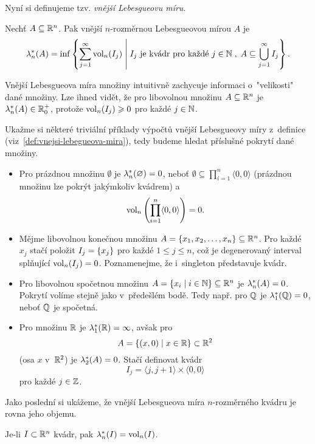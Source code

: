Nyní si definujeme tzv. \emph{vnější Lebesgueovu míru}.
\begin{definition}\label{def:vnejsi-lebegueova-mira}
    Nechť $A\subseteq\mathbb{R}^n$. Pak vnější $n$-rozměr\-nou Lebesgueovou mírou $A$ je
    \[\lambda_n^*(A)=\inf\left\{\sum_{j=1}^{\infty}\operatorname{vol}_n(I_j)\;\middle|\;\text{$I_j$ je kvádr pro každé $j\in\mathbb{N}$}\;,\;A\subseteq\bigcup_{j=1}^\infty I_j\right\}.\]
\end{definition}
Vnější Lebesgueova míra množiny intuitivně zachycuje informaci o~"velikosti" dané množiny.  Lze ihned vidět, že pro libovolnou množinu $A\subseteq\mathbb{R}^n$ je $\lambda_n^*(A)\in\mathbb{R}_0^+$, protože $\operatorname{vol}_n(I_j)\geqslant0$ pro každé $j\in\mathbb{N}$.
\begin{example}\label{ex:lebegueova-mira-trivialni-priklady}
    Ukažme si některé triviální příklady výpočtů vnější Lebesgueovy míry z~definice (viz~\ref{def:vnejsi-lebegueova-mira}), tedy budeme hledat příslušné pokrytí dané množiny.
    \begin{itemize}
        \item Pro prázdnou množinu $\emptyset$ je $\lambda_n^*(\varnothing)=0$, neboť $\emptyset\subseteq\prod_{i=1}^{n}\langle0,0\rangle$ (prázdnou množinu lze pokrýt jakýmkoliv kvádrem) a
        \[\operatorname{vol}_n\left(\prod_{i=1}^{n}\langle0,0\rangle\right)=0.\]
        \item Mějme libovolnou konečnou množinu $A=\left\{x_1,x_2,\dots,x_n\right\}\subseteq\mathbb{R}^n$. Pro každé $x_j$ stačí položit $I_j=\left\{x_j\right\}$ pro každé $1\leqslant j\leqslant n$, což je degenerovaný interval splňující $\operatorname{vol}_n(I_j)=0$. Poznamenejme, že i~singleton představuje kvádr.
        \item Pro libovolnou spočetnou množinu $A=\left\{x_i\mid i\in\mathbb{N}\right\}\subseteq\mathbb{R}^n$ je $\lambda_n^*(A)=0$. Pokrytí volíme stejně jako v~předešlém bodě. Tedy např. pro $\mathbb{Q}$ je $\lambda_1^*(\mathbb{Q})=0$, neboť $\mathbb{Q}$ je spočetná.
        \item Pro množinu $\mathbb{R}$ je $\lambda_1^*(\mathbb{R})=\infty$, avšak pro 
        \[A=\left\{(x,0)\mid x\in\mathbb{R}\right\}\subset\mathbb{R}^2\]
        (osa $x$ v~$\mathbb{R}^2$) je $\lambda_2^*(A)=0$. Stačí definovat kvádr
        \[I_j=\langle j,j+1\rangle\times\langle 0,0\rangle\]
        pro každé $j\in\mathbb{Z}$.
    \end{itemize}
\end{example}
Jako poslední si ukážeme, že vnější Lebesgueova míra $n$-rozměrného kvádru je rovna jeho objemu.
\begin{proposition}\label{prop:lebegueova-mira-objem-kvadru}
    Je-li $I\subset\mathbb{R}^n$ kvádr, pak $\lambda_n^*(I)=\operatorname{vol}_n(I)$.
\end{proposition}
